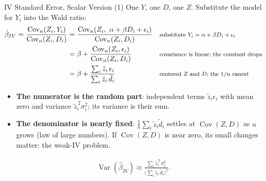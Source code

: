 \documentclass[aspectratio=169,11pt,xcolor=dvipsnames]{beamer}
\DeclareMathOperator{\Cov}{Cov}
\DeclareMathOperator{\Var}{Var}
\begin{document}
\begin{frame}{IV Standard Error, Scalar Version (1)}
One $Y$, one $D$, one $Z$. Substitute the model for $Y_i$ into the Wald ratio:
\begin{align*}
  \hat\beta_{IV} = \frac{\Cov_n(Z_i, Y_i)}{\Cov_n(Z_i, D_i)}
    &= \frac{\Cov_n(Z_i,\ \alpha + \beta D_i + \epsilon_i)}{\Cov_n(Z_i, D_i)}
    && \text{\footnotesize substitute $Y_i = \alpha + \beta D_i + \epsilon_i$} \\
    &= \beta + \frac{\Cov_n(Z_i, \epsilon_i)}{\Cov_n(Z_i, D_i)}
    && \text{\footnotesize covariance is linear; the constant drops} \\
    &= \beta + \frac{\sum_i \tilde z_i\,\epsilon_i}{\sum_i \tilde z_i\,\tilde d_i}
    && \text{\footnotesize centered $Z$ and $D$; the $1/n$ cancel}
\end{align*}
\vskip-8pt
\begin{itemize}\itemsep1pt
  \item \textbf{The numerator is the random part}: independent terms
        $\tilde z_i \epsilon_i$ with mean zero and variance $\tilde z_i^{\,2}\sigma_i^2$; its
        variance is their sum.
  \item \textbf{The denominator is nearly fixed}: $\frac{1}{n}\sum_i \tilde z_i\tilde d_i$
        settles at $\Cov(Z, D)$ as $n$ grows (law of large numbers). If
        $\Cov(Z, D)$ is near zero, its small changes matter: the weak-IV problem.
\end{itemize}
\vskip-6pt
\begin{align*}
  \Var(\hat\beta_{IV}) \approx \frac{\sum_i \tilde z_i^{\,2}\,\sigma_i^2}{\big(\sum_i \tilde z_i\,\tilde d_i\big)^2} .
\end{align*}
\end{frame}
\end{document}
